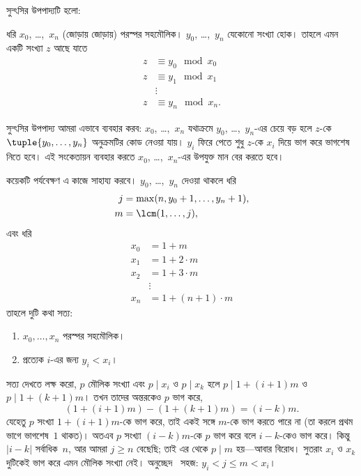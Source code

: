 \documentclass[../../../include/open-logic-section]{subfiles}
\begin{document}
সুন্ৎসির উপপাদ্যটি হলো:
\begin{thm}
ধরি $x_0$, \dots,~$x_n$ (জোড়ায় জোড়ায়) পরস্পর সহমৌলিক। $y_0$,
\dots,~$y_n$ যেকোনো সংখ্যা হোক। তাহলে এমন একটি সংখ্যা $z$ আছে যাতে
\begin{align*}
z & \equiv y_0 \mod x_0 \\
z & \equiv y_1 \mod x_1 \\
& \vdots  \\
z & \equiv y_n \mod x_n.
\end{align*}
\end{thm}

সুন্ৎসির উপপাদ্য আমরা এভাবে ব্যবহার করব: $x_0$, \dots,~$x_n$ যথাক্রমে
$y_0$, \dots,~$y_n$-এর চেয়ে বড় হলে $z$-কে
$\tuple{y_0, \dots,y_n}$ অনুক্রমটির কোড নেওয়া যায়। $y_i$ ফিরে পেতে শুধু
$z$-কে $x_i$ দিয়ে ভাগ করে ভাগশেষ নিতে হবে। এই সংকেতায়ন ব্যবহার করতে
$x_0$, \dots,~$x_n$-এর উপযুক্ত মান বের করতে হবে।

কয়েকটি পর্যবেক্ষণ এ কাজে সাহায্য করবে। $y_0$, \dots,~$y_n$ দেওয়া থাকলে
ধরি
\begin{align*}
j &= \max(n, y_0 + 1, \dots, y_n + 1), \\
m &= \lcm(1,\dots,j),
\end{align*}
এবং ধরি
\begin{align*}
x_0 & = 1 + m \\
x_1 & = 1 + 2 \cdot m \\
x_2 & = 1 + 3 \cdot m \\
& \vdots  \\
x_n & = 1 + (n+1) \cdot m
\end{align*}
তাহলে দুটি কথা সত্য:
\begin{enumerate}
\item{} $x_0,\dots,x_n$ পরস্পর সহমৌলিক।
\item{} প্রত্যেক $i$-এর জন্য $y_i < x_i$।
\end{enumerate}
 সত্য দেখতে লক্ষ করো, $p$ মৌলিক সংখ্যা এবং $p \mid x_i$
ও $p \mid x_k$ হলে $p \mid 1 + (i+1) m$ ও
$p \mid 1 + (k+1) m$। তখন তাদের অন্তরকেও $p$ ভাগ করে,
\[
(1 + (i+1)m) - (1+ (k+1)m) = (i-k) m.
\]
যেহেতু $p$ সংখ্যা $1 + (i+1)m$-কে ভাগ করে, তাই একই সঙ্গে $m$-কে ভাগ করতে
পারে না (তা করলে প্রথম ভাগে ভাগশেষ~$1$ থাকত)। অতএব $p$ সংখ্যা
$(i-k)m$-কে $p$ ভাগ করে বলে $i-k$-কেও ভাগ করে। কিন্তু
$\left|i-k\right|$ সর্বাধিক~$n$, আর আমরা $j \geq n$ বেছেছি; তাই এর থেকে
$p \mid m$ হয়—আবার বিরোধ। সুতরাং $x_i$ ও $x_k$ দুটিকেই ভাগ করে এমন মৌলিক
সংখ্যা নেই। অনুচ্ছেদ~ সহজ:
$y_i < j \leq m < x_i$।
\end{document}
